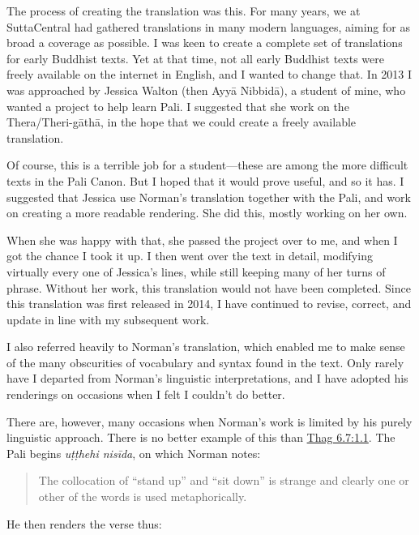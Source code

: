 \documentclass[12pt,openany]{book}%
\begin{document}
The process of creating the translation was this. For many years, we at SuttaCentral had gathered translations in many modern languages, aiming for as broad a coverage as possible. I was keen to create a complete set of translations for early Buddhist texts. Yet at that time, not all early Buddhist texts were freely available on the internet in English, and I wanted to change that. In 2013 I was approached by Jessica Walton (then \textsanskrit{Ayyā} \textsanskrit{Nibbidā}), a student of mine, who wanted a project to help learn Pali. I suggested that she work on the Thera/Theri-\textsanskrit{gāthā}, in the hope that we could create a freely available translation.

Of course, this is a terrible job for a student—these are among the more difficult texts in the Pali Canon. But I hoped that it would prove useful, and so it has. I suggested that Jessica use Norman’s translation together with the Pali, and work on creating a more readable rendering. She did this, mostly working on her own.

When she was happy with that, she passed the project over to me, and when I got the chance I took it up. I then went over the text in detail, modifying virtually every one of Jessica’s lines, while still keeping many of her turns of phrase. Without her work, this translation would not have been completed. Since this translation was first released in 2014, I have continued to revise, correct, and update in line with my subsequent work.

I also referred heavily to Norman’s translation, which enabled me to make sense of the many obscurities of vocabulary and syntax found in the text. Only rarely have I departed from Norman’s linguistic interpretations, and I have adopted his renderings on occasions when I felt I couldn’t do better.

There are, however, many occasions when Norman’s work is limited by his purely linguistic approach. There is no better example of this than \href{https://suttacentral.net/thag6.7/en/sujato\#1.1}{Thag 6.7:1.1}. The Pali begins \textit{\textsanskrit{uṭṭhehi} \textsanskrit{nisīda}}, on which Norman notes:

\begin{quotation}%
The collocation of “stand up” and “sit down” is strange and clearly one or other of the words is used metaphorically.

%
\end{quotation}

He then renders the verse thus:
\end{document}
